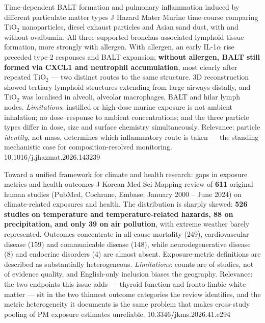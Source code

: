 \documentclass[10pt]{article}
\begin{document}
{Time-dependent BALT formation and pulmonary inflammation induced by different
particulate matter types}
{J Hazard Mater}
{Murine time-course comparing TiO$_2$ nanoparticles, diesel exhaust particles and Asian
sand dust, with and without ovalbumin. All three supported bronchus-associated lymphoid
tissue formation, more strongly with allergen. With allergen, an early IL-1$\alpha$ rise
preceded type-2 responses and BALT expansion; \textbf{without allergen, BALT still formed
via CXCL1 and neutrophil accumulation}, most clearly after repeated TiO$_2$ --- two
distinct routes to the same structure. 3D reconstruction showed tertiary lymphoid
structures extending from large airways distally, and TiO$_2$ was localised in alveoli,
alveolar macrophages, BALT and hilar lymph nodes. \emph{Limitations}: instilled or
high-dose murine exposure is not ambient inhalation; no dose--response to ambient
concentrations; and the three particle types differ in dose, size and surface chemistry
simultaneously. Relevance: particle \emph{identity}, not mass, determines which
inflammatory route is taken --- the standing mechanistic case for composition-resolved
monitoring.}
{10.1016/j.jhazmat.2026.143239}


{Toward a unified framework for climate and health research: gaps in exposure metrics and
health outcomes}
{J Korean Med Sci}
{Mapping review of \textbf{611} original human studies (PubMed, Cochrane, Embase;
January 2000 -- June 2024) on climate-related exposures and health. The distribution is
sharply skewed: \textbf{526 studies on temperature and temperature-related hazards, 88 on
precipitation, and only 39 on air pollution}, with extreme weather barely represented.
Outcomes concentrate in all-cause mortality (249), cardiovascular disease (159) and
communicable disease (148), while neurodegenerative disease (8) and endocrine disorders
(4) are almost absent. Exposure-metric definitions are described as substantially
heterogeneous. \emph{Limitations}: counts are of studies, not of evidence quality, and
English-only inclusion biases the geography. Relevance: the two endpoints this issue
adds --- thyroid function and fronto-limbic white matter --- sit in the two thinnest
outcome categories the review identifies, and the metric heterogeneity it documents is the
same problem that makes cross-study pooling of PM exposure estimates unreliable.}
{10.3346/jkms.2026.41.e294}
\end{document}
